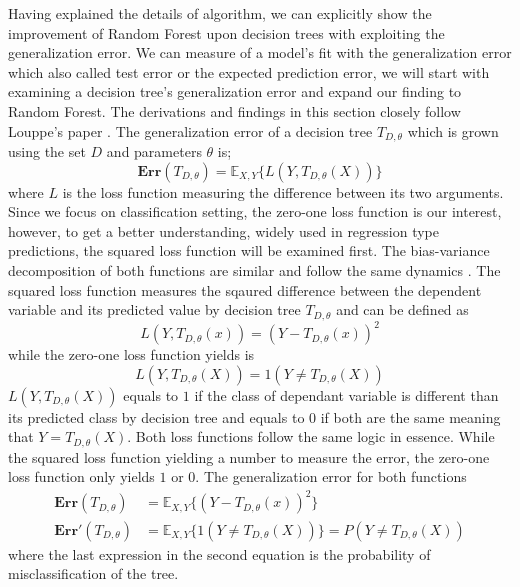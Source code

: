 Having explained the details of algorithm, we can explicitly show the improvement of Random Forest upon decision trees 
with exploiting the generalization error. 
We can measure of a model's fit with the generalization error which also called test error or the expected prediction error, 
we will start with examining a decision tree's generalization error and expand our finding to Random Forest. 
The derivations and findings in this section closely follow Louppe's paper \cite{louppe2014understanding}.
The generalization error of a decision tree $T_{D,\theta}$ which is grown using the set $D$ and parameters $\theta$ is;
\begin{equation}
	\boldsymbol{Err}(T_{D,\theta}) = \mathbb{E}_{X,Y}\{L(Y, T_{D,\theta}(X)) \}
\end{equation}
where $L$ is the loss function measuring the difference between its two arguments. Since we focus on classification setting, 
the zero-one loss function is our interest, however, to get a better understanding, widely used in regression type predictions, 
the squared loss function will be examined first. The bias-variance decomposition of both functions are similar and 
follow the same dynamics \cite{domingos2000decomposition}. 
The squared loss function measures the sqaured difference between the dependent variable and its predicted value 
by decision tree $T_{D,\theta}$ and can be defined as
\begin{equation}
	L(Y, T_{D, \theta}(x)) = (Y - T_{D, \theta}(x))^2
\end{equation}
while the zero-one loss function yields is
\begin{equation}
	L(Y, T_{D,\theta}(X)) = 1 (Y \neq T_{D, \theta}(X))
\end{equation}
$L(Y, T_{D,\theta}(X))$ equals to $1$ if the class of dependant variable is 
different than its predicted class by decision tree and equals to 0 if both are the same 
meaning that $Y = T_{D, \theta}(X)$. 
Both loss functions follow the same logic in essence. 
While the squared loss function yielding a number to measure the error, 
the zero-one loss function only yields $1$ or $0$.
The generalization error for both functions 
\begin{align}
	\boldsymbol{Err}(T_{D,\theta}) & = \mathbb{E}_{X,Y}\{ (Y - T_{D, \theta}(x))^2 \} \\
	\boldsymbol{Err'}(T_{D,\theta}) & = \mathbb{E}_{X,Y}\{ 1(Y \neq T_{D, \theta}(X)) \}
	= P(Y \neq T_{D, \theta}(X))
\end{align}
where the last expression in the second equation is the probability of misclassification of the tree.

